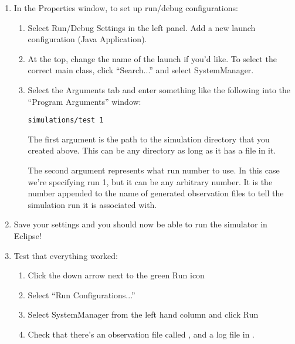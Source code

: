 \documentclass[11pt]{article}
\begin{document}
\begin{enumerate}
\item In the Properties window, to set up run/debug configurations:
  \begin{enumerate}
  \item Select Run/Debug Settings in the left panel. Add a new launch
    configuration (Java Application).
  \item At the top, change the name of the launch if you'd like. To select the
    correct main class, click ``Search...'' and select SystemManager.
  \item Select the Arguments tab and enter something like the following into the
    ``Program Arguments'' window:

\begin{verbatim}
simulations/test 1
\end{verbatim}

The first argument is the path to the simulation directory that you created
above.  This can be any directory as long as it has a
 file in it.

The second argument represents what run number to use. In this case we're
specifying run 1, but it can be any arbitrary number. It is the number appended
to the name of generated observation files to tell the simulation run it is
associated with.
  \end{enumerate}
  
\item Save your settings and you should now be able to run the simulator in
Eclipse!

\item Test that everything worked:
  \begin{enumerate}
  \item Click the down arrow next to the green Run icon
  \item Select ``Run Configurations...''
  \item Select SystemManager from the left hand column and click Run
  \item Check that there's an observation file called
    , and a log file in
    .
  \end{enumerate}

\end{enumerate}
\end{document}
